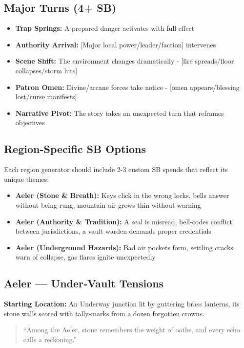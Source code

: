 \subsection*{Major Turns (4+ SB)}
\begin{itemize}
\item \textbf{Trap Springs:} A prepared danger activates with full effect
\item \textbf{Authority Arrival:} [Major local power/leader/faction] intervenes
\item \textbf{Scene Shift:} The environment changes dramatically - [fire spreads/floor collapses/storm hits]
\item \textbf{Patron Omen:} Divine/arcane forces take notice - [omen appears/blessing lost/curse manifests]
\item \textbf{Narrative Pivot:} The story takes an unexpected turn that reframes objectives
\end{itemize}

\subsection*{Region-Specific SB Options}
Each region generator should include 2-3 custom SB spends that reflect its unique themes:

\begin{itemize}
\item \textbf{Aeler (Stone \& Breath):} Keys click in the wrong locks, bells answer without being rung, mountain air grows thin without warning
\item \textbf{Aeler (Authority \& Tradition):} A seal is misread, bell-codes conflict between jurisdictions, a vault warden demands proper credentials
\item \textbf{Aeler (Underground Hazards):} Bad air pockets form, settling cracks warn of collapse, gas flares ignite unexpectedly
\end{itemize}

\subsection*{Aeler — Under‑Vault Tensions}
\textbf{Starting Location:} An Underway junction lit by guttering brass lanterns, its stone walls scored with tally‑marks from a dozen forgotten crowns.
\begin{quote}
“Among the Aeler, stone remembers the weight of oaths, and every echo calls a reckoning.”
\end{quote}

